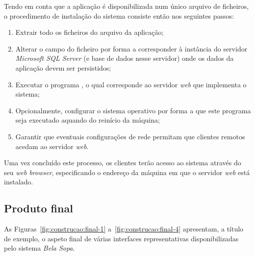 Tendo em conta que a aplicação é disponibilizada num único arquivo de ficheiros, o procedimento de instalação do sistema consiste então nos seguintes passos:

\begin{enumerate}

    \item Extrair todo os ficheiros do arquivo da aplicação;

    \item Alterar o campo  do ficheiro  por forma a corresponder à instância do servidor \emph{Microsoft SQL Server} (e base de dados nesse servidor) onde os dados da aplicação devem ser persistidos;
    
    \item Executar o programa , o qual corresponde ao servidor \emph{web} que implementa o sistema;
    
    \item Opcionalmente, configurar o sistema operativo por forma a que este programa seja executado aquando do reinício da máquina;

    \item Garantir que eventuais configurações de rede permitam que clientes remotos acedam ao servidor \emph{web}.
    
\end{enumerate}

Uma vez concluído este processo, os clientes terão acesso ao sistema através do seu \emph{web browser}, especificando o endereço da máquina em que o servidor \emph{web} está instalado.


\subsection{Produto final}
\label{sec:construcao:produto-final}

As Figuras~\ref{fig:construcao:final-1} a~\ref{fig:construcao:final-4} apresentam, a título de exemplo, o aspeto final de várias interfaces representativas disponibilizadas pelo sistema \emph{Bela Sopa}.


